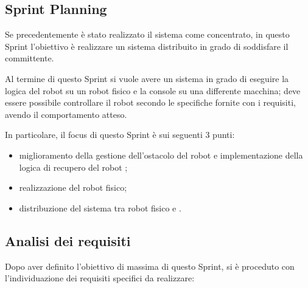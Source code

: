 \subsection{Sprint Planning}

Se precedentemente è stato realizzato il sistema come concentrato, in questo Sprint l'obiettivo è realizzare un sistema distribuito in grado di soddisfare il committente.

Al termine di questo Sprint si vuole avere un sistema in grado di eseguire la logica del robot su un robot fisico e la console su una differente macchina;
deve essere possibile controllare il robot secondo le specifiche fornite con i requisiti, avendo il comportamento atteso.

In particolare, il focus di questo Sprint è sui seguenti 3 punti:

\begin{itemize}
  \item
    miglioramento della gestione dell'ostacolo del robot 
    e implementazione della logica di recupero del robot ;
  \item
    realizzazione del robot fisico;
  \item
    distribuzione del sistema tra robot fisico e .
\end{itemize}

\subsection{Analisi dei requisiti}

Dopo aver definito l'obiettivo di massima di questo Sprint, si è proceduto con l'individuazione dei requisiti specifici da realizzare:

